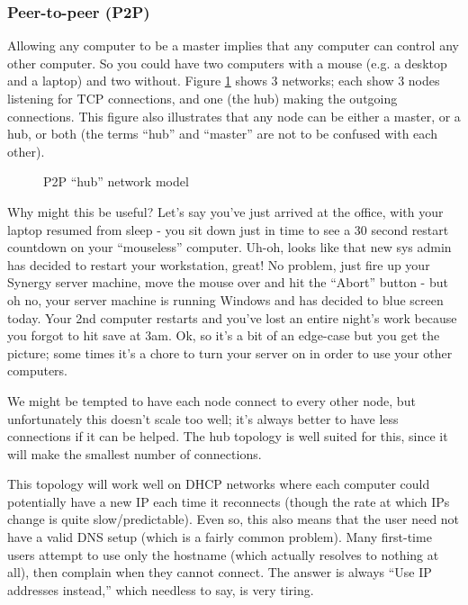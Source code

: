 \subsubsection{Peer-to-peer (P2P)}


Allowing any computer to be a master implies that any computer can control
any other computer. So you could have two computers with a mouse (e.g. a 
desktop and a laptop) and two without. Figure \ref{fig:p2p} shows 3 networks;
each show 3 nodes listening for TCP connections, and one (the hub) making the
outgoing connections. This figure also illustrates that any node can be either
a master, or a hub, or both (the terms ``hub'' and ``master'' are not to be 
confused with each other).

\begin{figure}[ht!]
  \centering
  
  \caption{P2P ``hub'' network model}
  \label{fig:p2p}
\end{figure}

Why might this be useful? Let's say you've just arrived at the
office, with your laptop resumed from sleep - you sit down just in time to see
a 30 second restart countdown on your ``mouseless'' computer. Uh-oh, looks like
that new sys admin has decided to restart your workstation, great! No problem, 
just fire up your Synergy server machine, move the mouse over and hit the 
``Abort'' button - but oh no, your server machine is running Windows and has 
decided to blue screen today. Your 2nd computer restarts and you've lost an 
entire night's work because you forgot to hit save at 3am. Ok, so it's a bit 
of an edge-case but you get the picture; some times it's a chore to turn your
server on in order to use your other computers.

We might be tempted to have each node connect to every other node, but
unfortunately this doesn't scale too well; it's always better to have less
connections if it can be helped. The hub topology is well suited for this,
since it will make the smallest number of connections.

This topology will work well on DHCP networks where
each computer could potentially have a new IP each time it reconnects (though
the rate at which IPs change is quite slow/predictable). Even so, this also 
means that the user need not have a valid DNS setup (which is a fairly common
problem). Many first-time users attempt to use only the hostname (which actually
resolves to nothing at all), then complain when they cannot connect. The answer
is always ``Use IP addresses instead,'' which needless to say, is very tiring.

